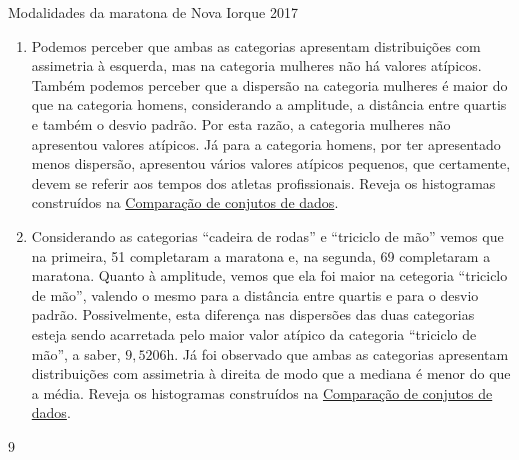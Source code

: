 {{{\begin{answer}{Modalidades da maratona de Nova Iorque 2017}
{\begin{enumerate}
Logo, conclui-se que nestas categorias tem-se assimetria à direita acentuada. Observe, que nestes dois casos tem-se que a mediana é menor do que a média. Reveja os histogramas construídos na ativ-comparacao-de-diferentes-grupos.

Considerando as categorias “homens”{} e “mulheres”, vemos que

\begin{align*}
Q_1-\text{Min}&>>\text{Max}-Q_3;\\
\text{Mediana}-Q_1&>Q_3-\text{Mediana e}\\ 
\text{Mediana}-\text{Min}&>>\text{Max}-\text{mediana},\\
\end{align*}
em que o símbolo $>>$ é usado para indicar “bem maior do que”. Logo, conclui-se que nestas categorias tem-se assimetria à esquerda acentuada. Observe, que nestes dois casos tem-se que a mediana é maior do que a média. Reveja os histogramas construídos na atividade \hyperref[\detokenize{PE104-5:ativ-compara-categorias}]{Comparação de conjutos de dados}.

\item Podemos perceber que ambas as categorias apresentam distribuições com assimetria à esquerda, mas na categoria mulheres não há valores atípicos. Também podemos perceber que a dispersão na categoria mulheres é maior do que na categoria homens, considerando a amplitude, a distância entre quartis e também o desvio padrão. Por esta razão, a categoria mulheres não apresentou valores atípicos. Já para a categoria homens, por ter apresentado menos dispersão, apresentou vários valores atípicos pequenos, que certamente, devem se referir aos tempos dos atletas profissionais. Reveja os histogramas construídos na \hyperref[\detokenize{PE104-5:ativ-compara-categorias}]{Comparação de conjutos de dados}.

\item Considerando as categorias “cadeira de rodas”{} e “triciclo de mão”{} vemos que na primeira, 51 completaram a maratona e, na segunda, 69 completaram a maratona. Quanto à amplitude, vemos que ela foi maior na cetegoria “triciclo de mão”, valendo o mesmo para a distância entre quartis e para o desvio padrão. Possivelmente, esta diferença nas dispersões das duas categorias esteja sendo acarretada pelo maior valor atípico da categoria “triciclo de mão”, a saber, $9{,}5206$h. Já foi observado que ambas as categorias apresentam distribuições com assimetria à direita de modo que a mediana é menor do que a média. Reveja os histogramas construídos na \hyperref[\detokenize{PE104-5:ativ-compara-categorias}]{Comparação de conjutos de dados}.
\end{enumerate}
}{9}
\end{answer}

}}}
